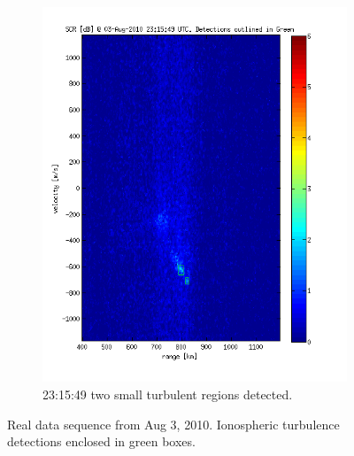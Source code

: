 \begin{figure}
\begin{subfigure}[t]{0.45\linewidth}
        \includegraphics[width=\linewidth]{gfx/out-005}
        \caption{23:15:49 two small turbulent regions detected.}
    \end{subfigure}
    \caption{Real data sequence from Aug 3, 2010. Ionospheric turbulence detections enclosed in green boxes.}
    \label{fig:gmmdump}
\end{figure}
